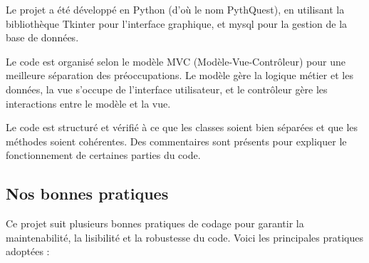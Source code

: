 \documentclass{article}
\begin{document}
Le projet a été développé en Python (d'où le nom PythQuest), en utilisant la bibliothèque Tkinter pour l'interface graphique, et mysql pour la gestion de la base de données.

Le code est organisé selon le modèle MVC (Modèle-Vue-Contrôleur) pour une meilleure séparation des préoccupations. Le modèle gère la logique métier et les données, la vue s'occupe de l'interface utilisateur, et le contrôleur gère les interactions entre le modèle et la vue.

Le code est structuré et vérifié à ce que les classes soient bien séparées et que les méthodes soient cohérentes. Des commentaires sont présents pour expliquer le fonctionnement de certaines parties du code.

\subsection{Nos bonnes pratiques}

Ce projet suit plusieurs bonnes pratiques de codage pour garantir la maintenabilité, la lisibilité et la robustesse du code. Voici les principales pratiques adoptées :
\end{document}
